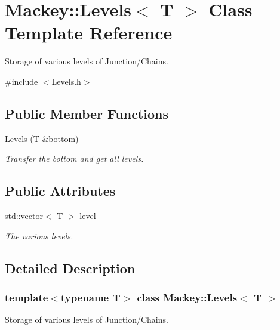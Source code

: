 \hypertarget{classMackey_1_1Levels}{}\section{Mackey\+:\+:Levels$<$ T $>$ Class Template Reference}
\label{classMackey_1_1Levels}


Storage of various levels of Junction/\+Chains.  




{\ttfamily \#include $<$Levels.\+h$>$}

\subsection*{Public Member Functions}
\begin{DoxyCompactItemize}
\item 
\hyperlink{classMackey_1_1Levels_a450b9aba828f03dd340e89169a4bd9e0}{Levels} (T \&bottom)
\begin{DoxyCompactList}\small\item\em Transfer the bottom and get all levels. \end{DoxyCompactList}\end{DoxyCompactItemize}
\subsection*{Public Attributes}
\begin{DoxyCompactItemize}
\item 
std\+::vector$<$ T $>$ \hyperlink{classMackey_1_1Levels_af9a1391f683685ae464829b9b32162c8}{level}
\begin{DoxyCompactList}\small\item\em The various levels. \end{DoxyCompactList}\end{DoxyCompactItemize}


\subsection{Detailed Description}
\subsubsection*{template$<$typename T$>$\newline
class Mackey\+::\+Levels$<$ T $>$}

Storage of various levels of Junction/\+Chains. 

